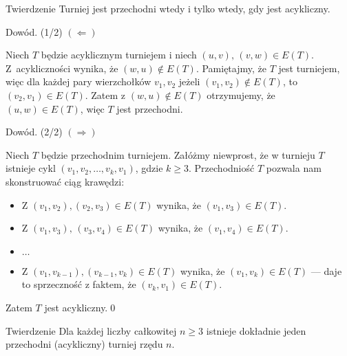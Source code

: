 \documentclass[a4paper,10pt]{beamer}
\begin{document}
\begin{frame}
\begin{block}{Twierdzenie}
Turniej jest przechodni wtedy i tylko wtedy, gdy jest acykliczny.
\end{block}

\begin{block}{Dowód. (1/2)}
$(\Leftarrow)$

Niech $T$ będzie acyklicznym turniejem i niech $(u,v),\,(v,w)\in E(T)$. Z~acykliczności wynika, że $(w,u)\not\in E(T)$. Pamiętajmy, że $T$ jest turniejem, więc dla każdej pary wierzchołków $v_1,v_2$ jeżeli $(v_1,v_2)\not\in E(T)$, to $(v_2,v_1)\in E(T)$. Zatem z $(w,u)\not\in E(T)$ otrzymujemy, że $(u,w)\in E(T)$, więc $T$ jest przechodni. 

\end{block}
\end{frame}

\begin{frame}

\begin{block}{Dowód. (2/2)}
$(\Rightarrow)$

Niech $T$ będzie przechodnim turniejem. Załóżmy niewprost, że w turnieju $T$ istnieje cykl $(v_1,v_2,\ldots,v_k,v_1)$, gdzie $k\geqslant3$. Przechodniość $T$ pozwala nam skonstruować ciąg krawędzi:
\begin{itemize}
\item Z $(v_1,v_2),(v_2,v_3)\in E(T)$ wynika, że $(v_1,v_3)\in E(T)$. 
\item Z $(v_1,v_3),\,(v_3,v_4)\in E(T)$ wynika, że $(v_1,v_4)\in E(T)$.
\item $\ldots$
\item Z $(v_1,v_{k-1}),(v_{k-1},v_k)\in E(T)$ wynika, że $(v_1,v_k)\in E(T)$ --- daje to sprzeczność z faktem, że $(v_k,v_1)\in E(T)$.
\end{itemize}
Zatem $T$ jest acykliczny.\vfill\qed
\end{block}

\medskip

\begin{block}{Twierdzenie}
Dla każdej liczby całkowitej $n\geqslant3$ istnieje dokładnie jeden przechodni (acykliczny) turniej rzędu $n$.
\end{block}

\end{frame}
\end{document}
